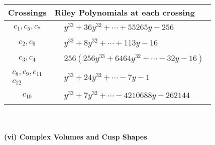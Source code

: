 \documentclass[1p]{elsarticle_modified}
\theoremstyle{definition}
\begin{document}
\begin{tabular}{m{50pt}|m{274pt}}
Crossings & \hspace{64pt}Riley Polynomials at each crossing \\
\hline $$\begin{aligned}c_{1},c_{5},c_{7}\end{aligned}$$&$\begin{aligned}
&y^{33}+36 y^{32}+\cdots+55265 y-256
\end{aligned}$\\
\hline $$\begin{aligned}c_{2},c_{6}\end{aligned}$$&$\begin{aligned}
&y^{33}+8 y^{32}+\cdots+113 y-16
\end{aligned}$\\
\hline $$\begin{aligned}c_{3},c_{4}\end{aligned}$$&$\begin{aligned}
&256(256 y^{33}+6464 y^{32}+\cdots-32 y-16)
\end{aligned}$\\
\hline $$\begin{aligned}c_{8},c_{9},c_{11}\\c_{12}\end{aligned}$$&$\begin{aligned}
&y^{33}+24 y^{32}+\cdots-7 y-1
\end{aligned}$\\
\hline $$\begin{aligned}c_{10}\end{aligned}$$&$\begin{aligned}
&y^{33}+7 y^{32}+\cdots-4210688 y-262144
\end{aligned}$\\
\hline
\end{tabular}\\~\\
\newpage\flushleft \textbf{(vi) Complex Volumes and Cusp Shapes}
\end{document}
